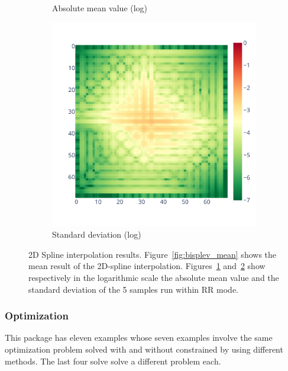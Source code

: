 \documentclass[11pt]{article}
\newcommand{\tristan}[1]{\color{orange}\textbf{From Tristan:} #1\color{black}\xspace}
\begin{document}
\begin{figure}
\begin{subfigure}{.3\textwidth}
    \caption{Absolute mean value (log)}
    \label{fig:bisplev_mean_log}
\end{subfigure}
\begin{subfigure}{.3\textwidth}
    \centering
    \includegraphics[width=\linewidth]{figure/spline_2d/bisplev_std_log.pdf}
    \caption{Standard deviation (log)}
    \label{fig:bisplev_std_log}
\end{subfigure}
    \caption{2D Spline interpolation results. Figure~\ref{fig:bisplev_mean} shows the mean result
    of the 2D-spline interpolation. Figures~\ref{fig:bisplev_mean_log} and~\ref{fig:bisplev_std_log}
    show respectively in the logarithmic scale the absolute mean value and the standard deviation 
    of the 5 samples run within RR mode. 
    }
    \label{fig:spline2d_rr}
\end{figure}


\subsubsection{Optimization}

This package has eleven examples whose seven examples involve the same optimization problem 
solved with and without constrained by using different methods.
The last four solve solve a different problem each.
\end{document}
